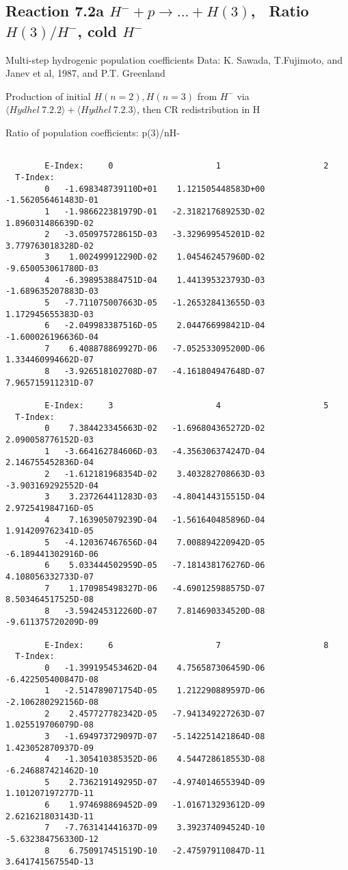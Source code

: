 \documentclass[12pt,dvipdfmx]{article}
\begin{document}
\subsection{
Reaction 7.2a $ H^- + p \rightarrow ...+ H(3) $, \   Ratio $H(3)/H^- $, cold $H^-$
}
Multi-step hydrogenic population coefficients
 Data: K. Sawada, T.Fujimoto, \cite{kn:Sawada} and Janev et al, 1987, and P.T. Greenland

Production of initial $H(n=2), H(n=3)$ from $H^-$ via $ \langle Hydhel~ 7.2.2\rangle + \langle Hydhel~ 7.2.3\rangle$,
 then CR redistribution in H

 Ratio of population coefficients: p(3)/nH-
\begin{small}\begin{verbatim}

        E-Index:     0                     1                     2
  T-Index:
        0   -1.698348739110D+01    1.121505448583D+00   -1.562056461483D-01
        1   -1.986622381979D-01   -2.318217689253D-02    1.896031486639D-02
        2   -3.050975728615D-03   -3.329699545201D-02    3.779763018328D-02
        3    1.002499912290D-02    1.045462457960D-02   -9.650053061780D-03
        4   -6.398953884751D-04    1.441395323793D-03   -1.689635207883D-03
        5   -7.711075007663D-05   -1.265328413655D-03    1.172945655383D-03
        6   -2.049983387516D-05    2.044766998421D-04   -1.600026196636D-04
        7    6.408878869927D-06   -7.052533095200D-06    1.334460994662D-07
        8   -3.926518102708D-07   -4.161804947648D-07    7.965715911231D-07

        E-Index:     3                     4                     5
  T-Index:
        0    7.384423345663D-02   -1.696804365272D-02    2.090058776152D-03
        1   -3.664162784606D-03   -4.356306374247D-04    2.146755452836D-04
        2   -1.612181968354D-02    3.403282708663D-03   -3.903169292552D-04
        3    3.237264411283D-03   -4.804144315515D-04    2.972541984716D-05
        4    7.163905079239D-04   -1.561640485896D-04    1.914209762341D-05
        5   -4.120367467656D-04    7.008894220942D-05   -6.189441302916D-06
        6    5.033444502959D-05   -7.181438176276D-06    4.108056332733D-07
        7    1.170985498327D-06   -4.690125988575D-07    8.503464517525D-08
        8   -3.594245312260D-07    7.814690334520D-08   -9.611375720209D-09

        E-Index:     6                     7                     8
  T-Index:
        0   -1.399195453462D-04    4.756587306459D-06   -6.422505400847D-08
        1   -2.514789071754D-05    1.212290889597D-06   -2.106280292156D-08
        2    2.457727782342D-05   -7.941349227263D-07    1.025519706079D-08
        3   -1.694973729097D-07   -5.142251421864D-08    1.423052870937D-09
        4   -1.305410385352D-06    4.544728618553D-08   -6.246887421462D-10
        5    2.736219149295D-07   -4.974014655394D-09    1.101207197277D-11
        6    1.974698869452D-09   -1.016713293612D-09    2.621621803143D-11
        7   -7.763141441637D-09    3.392374094524D-10   -5.632384756330D-12
        8    6.750917451519D-10   -2.475979110847D-11    3.641741567554D-13


\end{verbatim}
\end{small}
\end{document}
